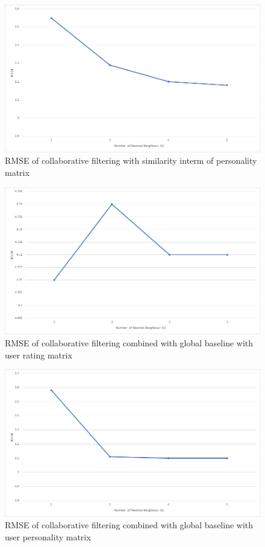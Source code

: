 \begin{figure}[h]
  \centering
    \includegraphics[width=1\textwidth]{fig/rmse_cf_personality.png}
    \caption{RMSE of collaborative filtering with similarity interm of personality matrix}
\end{figure}

\begin{figure}[h]
  \centering
    \includegraphics[width=1\textwidth]{fig/rmse_cf_global.png}
    \caption{RMSE of collaborative filtering combined with global baseline with user rating matrix}
\end{figure}

\begin{figure}[h]
  \centering
    \includegraphics[width=1\textwidth]{fig/rmse_cf_global_personality.png}
    \caption{RMSE of collaborative filtering combined with global baseline with user personality matrix}
\end{figure}

